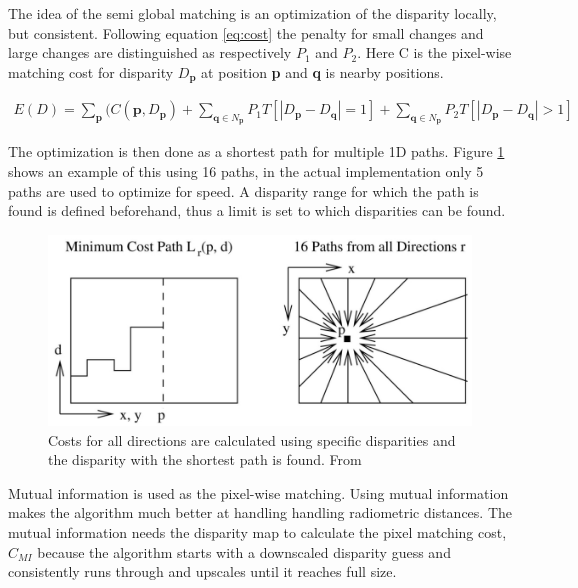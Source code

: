 The idea of the semi global matching is an optimization of the disparity locally, but consistent. Following equation \ref{eq:cost} the penalty for small changes and large changes are distinguished as respectively $P_{1}$ and $P_{2}$. Here C is the pixel-wise matching cost for disparity $D_{\textbf{p}}$ at position \textbf{p} and \textbf{q} is nearby positions.

\begin{equation}\label{eq:cost}
\begin{split}
E(D) = \sum\limits_{\textbf{p}}(C(\textbf{p},D_{\textbf{p}}) + \sum\limits_{\textbf{q} \in N_{\textbf{p}} } P_{1} T [|D_{\textbf{p}} - D_{\textbf{q}}| = 1] + \sum\limits_{\textbf{q} \in N_{\textbf{p}} } P_{2} T [|D_{\textbf{p}} - D_{\textbf{q}}| > 1]
\end{split}
\end{equation} 

The optimization is then done as a shortest path for multiple 1D paths. Figure \ref{fig:paths} shows an example of this using 16 paths, in the actual implementation only 5 paths are used to optimize for speed. A disparity range for which the path is found is defined beforehand, thus a limit is set to which disparities can be found. 

\begin{figure}[h!]
  \centering
    \includegraphics[scale=0.2]{graphics/06_vision/cost_aggregation.jpg}
      \caption{Costs for all directions are calculated using specific disparities and the disparity with the shortest path is found. From \cite{Hirschmuller2008}}
    \label{fig:paths}
\end{figure}

Mutual information \cite{egnal2000mutual} is used as the pixel-wise matching. Using mutual information makes the algorithm much better at handling handling radiometric distances. The mutual information needs the disparity map to calculate the pixel matching cost, $ C_{MI} $ because the algorithm starts with a downscaled disparity guess and consistently runs through and upscales until it reaches full size. 

